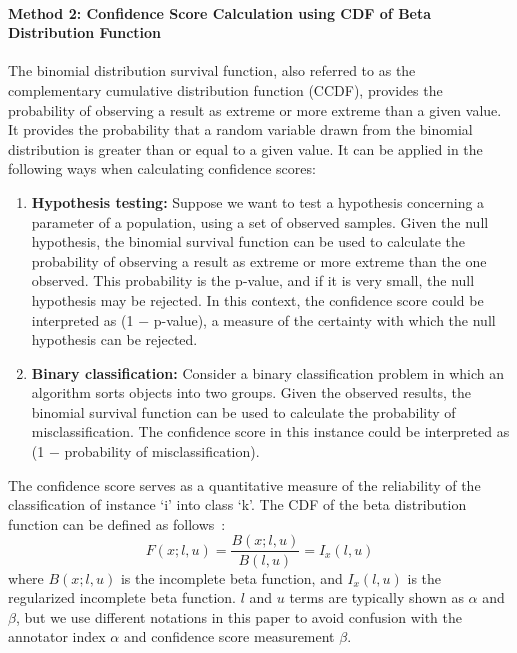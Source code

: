 \documentclass[sn-nature]{bst/sn-jnl}
\begin{document}
\paragraph*{Method 2: Confidence Score Calculation using CDF of Beta Distribution Function}
The binomial distribution survival function, also referred to as the complementary cumulative distribution function (CCDF), provides the probability of observing a result as extreme or more extreme than a given value. It provides the probability that a random variable drawn from the binomial distribution is greater than or equal to a given value. It can be applied in the following ways when calculating confidence scores:
\begin{enumerate}
    \item \textbf{Hypothesis testing:}
    Suppose we want to test a hypothesis concerning a parameter of a population, using a set of observed samples. Given the null hypothesis, the binomial survival function can be used to calculate the probability of observing a result as extreme or more extreme than the one observed. This probability is the p-value, and if it is very small, the null hypothesis may be rejected. In this context, the confidence score could be interpreted as (1 $-$ p-value), a measure of the certainty with which the null hypothesis can be rejected.
    \item \textbf{Binary classification:} Consider a binary classification problem in which an algorithm sorts objects into two groups. Given the observed results, the binomial survival function can be used to calculate the probability of misclassification. The confidence score in this instance could be interpreted as (1 $-$ probability of misclassification).
\end{enumerate}
The confidence score serves as a quantitative measure of the reliability of the classification of instance `i' into class `k'. The CDF of the beta distribution function can be defined as follows~\cite{BetaDistribution2023a}:
\begin{equation}
    F(x; l, u) = \frac{B(x; l, u)}{B(l, u)} = I_{x} (l, u)
    \label{eq:crowd.Eq.beta_distribution_function}
\end{equation}
where $B(x; l, u)$ is the incomplete beta function, and $I_{x}(l,u)$ is the regularized incomplete beta function. $l$ and $u$ terms are typically shown as $\alpha$ and $\beta$, but we use different notations in this paper to avoid confusion with the annotator index $\alpha$ and confidence score measurement $\beta$.
\end{document}
